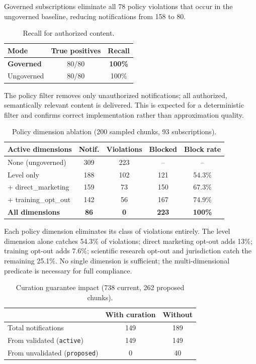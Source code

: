 \documentclass[11pt]{article}
\begin{document}
Governed subscriptions eliminate all 78 policy violations that occur in the ungoverned baseline, reducing notifications from 158 to 80.

\begin{table}[h]
\centering
\caption{Recall for authorized content.}
\label{tab:recall}
\small
\begin{tabular}{@{}lcc@{}}
\toprule
Mode & True positives & Recall \\
\midrule
\textbf{Governed} & 80/80 & \textbf{100\%} \\
Ungoverned & 80/80 & 100\% \\
\bottomrule
\end{tabular}
\end{table}

The policy filter removes only unauthorized notifications; all authorized, semantically relevant content is delivered. This is expected for a deterministic filter and confirms correct implementation rather than approximation quality.

\begin{table}[h]
\centering
\caption{Policy dimension ablation (200 sampled chunks, 93 subscriptions).}
\label{tab:ablation}
\small
\begin{tabular}{@{}lcccc@{}}
\toprule
Active dimensions & Notif. & Violations & Blocked & Block rate \\
\midrule
None (ungoverned) & 309 & 223 & -- & -- \\
Level only & 188 & 102 & 121 & 54.3\% \\
+ direct\_marketing & 159 & 73 & 150 & 67.3\% \\
+ training\_opt\_out & 142 & 56 & 167 & 74.9\% \\
\textbf{All dimensions} & \textbf{86} & \textbf{0} & \textbf{223} & \textbf{100\%} \\
\bottomrule
\end{tabular}
\end{table}

Each policy dimension eliminates its class of violations entirely. The level dimension alone catches 54.3\% of violations; direct marketing opt-out adds 13\%; training opt-out adds 7.6\%; scientific research opt-out and jurisdiction catch the remaining 25.1\%. No single dimension is sufficient; the multi-dimensional predicate is necessary for full compliance.

\begin{table}[h]
\centering
\caption{Curation guarantee impact (738 current, 262 proposed chunks).}
\label{tab:curation}
\small
\begin{tabular}{@{}lcc@{}}
\toprule
& With curation & Without \\
\midrule
Total notifications & 149 & 189 \\
From validated (\texttt{active}) & 149 & 149 \\
From unvalidated (\texttt{proposed}) & 0 & 40 \\
\bottomrule
\end{tabular}
\end{table}
\end{document}

